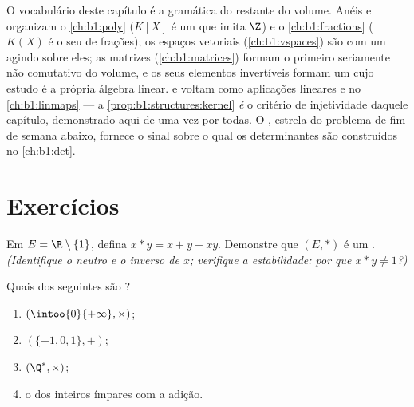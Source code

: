 \begin{remark}\label{rem:b1:structures:whereused}
O vocabulário deste capítulo é a gramática do restante do
volume. Anéis e  organizam o \cref{ch:b1:poly} ($K[X]$ é um
 que imita $\Z$) e o \cref{ch:b1:fractions} ($K(X)$ é o seu
 de frações); os espaços vetoriais (\cref{ch:b1:vspaces}) são
 com um  agindo sobre eles; as matrizes
(\cref{ch:b1:matrices}) formam o primeiro  seriamente
não comutativo do volume, e os seus elementos invertíveis formam um
 cujo estudo é a própria álgebra linear.  e  voltam
como aplicações lineares e  no \cref{ch:b1:linmaps} ---
a \cref{prop:b1:structures:kernel} \emph{é} o critério de injetividade
daquele capítulo, demonstrado aqui de uma vez por todas. O
, estrela do problema de fim de semana abaixo, fornece o
sinal sobre o qual os determinantes são construídos no \cref{ch:b1:det}.
\end{remark}

\section{Exercícios}

\begin{exercise}[$\star$]\label{exo:b1:structures:1}
Em $E = \R \setminus \{1\}$, defina $x * y = x + y - xy$. Demonstre que
$(E, *)$ é um . \emph{(Identifique o neutro e o
inverso de $x$; verifique a estabilidade: por que $x * y \neq 1$?)}
\end{exercise}

\begin{exercise}[$\star$]\label{exo:b1:structures:2}
Quais dos seguintes são ?
\begin{enumerate}
  \item $(\intoo{0}{+\infty}, \times)$;
  \item $(\{-1, 0, 1\}, +)$;
  \item $(\Q^*, \times)$;
  \item o  dos inteiros ímpares com a adição.
\end{enumerate}
\end{exercise}

